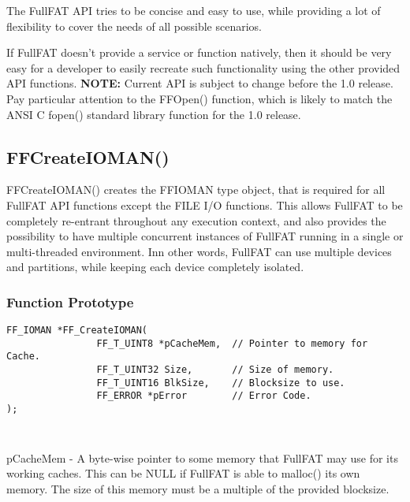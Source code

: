 The FullFAT API tries to be concise and easy to use, while providing a lot of flexibility to cover the needs of all possible scenarios.

If FullFAT doesn't provide a service or function natively, then it should be very easy for a developer to easily recreate such functionality using the other provided API functions.
\newline
\newline
\textbf{NOTE:} Current API is subject to change before the 1.0 release. Pay particular attention to the FF\textunderscore Open() function, which is likely to match the ANSI C fopen() standard library function for the 1.0 release.


\subsection{FF\textunderscore CreateIOMAN()}

FF\textunderscore CreateIOMAN() creates the FF\textunderscore IOMAN type object, that is required for all FullFAT API functions except the FILE I/O functions. This allows FullFAT to be completely re-entrant throughout any execution context, and also provides the possibility to have multiple concurrent instances of FullFAT running in a single or multi-threaded environment. Inn other words, FullFAT can use multiple devices and partitions, while keeping each device completely isolated.
\subsubsection{Function Prototype}
\begin{lstlisting}
FF_IOMAN *FF_CreateIOMAN(
				FF_T_UINT8 *pCacheMem, 	// Pointer to memory for Cache.
				FF_T_UINT32 Size, 		// Size of memory.
				FF_T_UINT16 BlkSize, 	// Blocksize to use.
				FF_ERROR *pError		// Error Code.
);
\end{lstlisting}

\begin{table}[t]
\centering
\begin{tabular}{}

\end{tabular}
\caption{}
\label{tab:}
\end{table}

pCacheMem - A byte-wise pointer to some memory that FullFAT may use for its working caches. This can be NULL if FullFAT is able to malloc() its own memory. The size of this memory must be a multiple of the provided blocksize.

